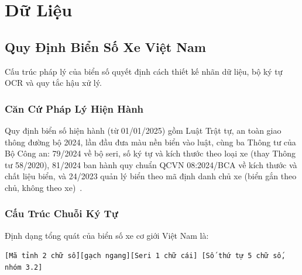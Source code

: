\chapter{Dữ Liệu}
\label{ch:dulieu}

\section{Quy Định Biển Số Xe Việt Nam}
\label{sec:quydinhbienso}

Cấu trúc pháp lý của biển số quyết định cách thiết kế nhãn dữ liệu, bộ ký tự OCR và quy
tắc hậu xử lý.

\subsection{Căn Cứ Pháp Lý Hiện Hành}

Quy định biển số hiện hành (từ 01/01/2025) gồm Luật Trật tự, an toàn giao thông đường bộ
2024, lần đầu đưa màu nền biển vào luật, cùng ba Thông tư của Bộ Công an: 79/2024 về bộ
seri, số ký tự và kích thước theo loại xe (thay Thông tư 58/2020), 81/2024 ban hành quy
chuẩn QCVN 08:2024/BCA về kích thước và chất liệu biển, và 24/2023 quản lý biển theo mã
định danh chủ xe (biển gắn theo chủ, không theo
xe)~\autocite{luatttatgt2024,tt792024bca,tt812024bca,tt242023bca}.

\subsection{Cấu Trúc Chuỗi Ký Tự}

Định dạng tổng quát của biển số xe cơ giới Việt Nam là:

\begin{center}
\texttt{[Mã tỉnh 2 chữ số][gạch ngang][Seri 1 chữ cái] [Số thứ tự 5 chữ số, nhóm 3.2]}
\end{center}

